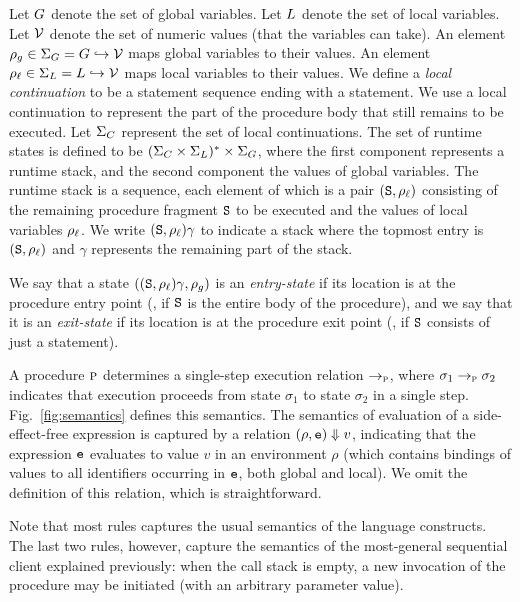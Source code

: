 Let $G$ denote the set of global variables. Let $L$ denote the set of local variables.
Let $\mathcal{V}$ denote the set of numeric values (that the variables can take).
An element $\rho_g \in \Sigma_G = G \hookrightarrow \mathcal{V}$ maps global variables to their values.
An element $\rho_\ell \in \Sigma_L = L \hookrightarrow \mathcal{V}$ maps local variables to their values.
We define a \emph{local continuation} to be a statement sequence ending with a  statement.
We use a local continuation to represent the part of the procedure body that still remains to be
executed. Let $\Sigma_C$ represent the set of local continuations.
The set of runtime states is defined to be $(\Sigma_C \times \Sigma_L)^* \times \Sigma_G$, where
the first component represents a runtime stack, and the second component the values of global
variables. The runtime stack is a sequence, each element of which is a pair $(\texttt{S},\rho_\ell)$ consisting of the
remaining procedure fragment $\texttt{S}$ to be executed and the values of local variables $\rho_\ell$.
We write $(\texttt{S},\rho_\ell)\gamma$ to indicate a stack where the topmost entry is $(\texttt{S},\rho_\ell)$
and $\gamma$ represents the remaining part of the stack.

We say that a state $((\texttt{S},\rho_\ell)\gamma,\rho_g)$ is an \emph{entry-state} if its location is at
the procedure entry point (\ie, if $\texttt{S}$ is the entire body of the procedure),
and we say that it is an \emph{exit-state} if its location is at the procedure exit point
(\ie, if $\texttt{S}$ consists of just a  statement).

A procedure $\textsc{p}$ determines a single-step execution relation $\rightarrow_{\textsc{p}}$,
where $\sigma_1 \rightarrow_{\textsc{p}} \sigma_2$ indicates
that execution proceeds from state $\sigma_1$ to state $\sigma_2$ in a single step.
Fig.~\ref{fig:semantics} defines this semantics.
The semantics of evaluation of a side-effect-free expression is captured
by a relation $({\rho},{\texttt{e}}) \Downarrow {v}$, indicating that the expression
$\texttt{e}$ evaluates to value $v$ in an environment $\rho$ (which contains bindings
of values to all identifiers occurring in $\texttt{e}$, both global and local).
We omit the definition of this relation, which is straightforward.

Note that most rules captures the usual semantics of the language constructs.
The last two rules, however, capture the semantics of the most-general sequential
client explained previously: when the call stack is empty, a new invocation of
the procedure may be initiated (with an arbitrary parameter value).

